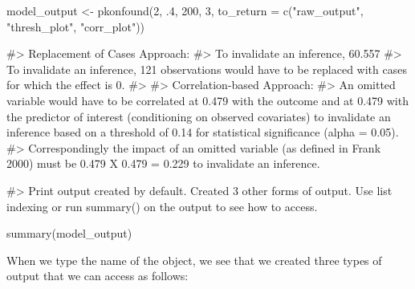 \begin{Schunk}
\begin{Sinput}
model_output <- pkonfound(2, .4, 200, 3, to_return = c("raw_output", "thresh_plot", "corr_plot"))
\end{Sinput}
\begin{Soutput}
#> Replacement of Cases Approach:
#> To invalidate an inference, 60.557% of the estimate would have to be due to bias. This is based on a threshold of 0.789 for statistical significance (alpha = 0.05).
#> To invalidate an inference, 121 observations would have to be replaced with cases for which the effect is 0.
#> 
#> Correlation-based Approach:
#> An omitted variable would have to be correlated at 0.479 with the outcome and at 0.479 with the predictor of interest (conditioning on observed covariates) to invalidate an inference based on a threshold of 0.14 for statistical significance (alpha = 0.05).
#> Correspondingly the impact of an omitted variable (as defined in Frank 2000) must be 0.479 X 0.479 = 0.229 to invalidate an inference.
\end{Soutput}
\begin{Soutput}
#> Print output created by default. Created 3 other forms of output. Use list indexing or run summary() on the output to see how to access.
\end{Soutput}
\begin{Sinput}
summary(model_output)
\end{Sinput}
\end{Schunk}

When we type the name of the object, we see that we created three types
of output that we can access as follows:


